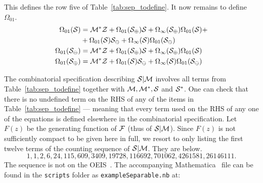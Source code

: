\documentclass[12pt, a4paper, twoside]{report}
\begin{document}
This defines the row five of Table~\ref{tab:sep_todefine}. It now remains to define $\Omega_{01}$. 
\begin{align}
  \begin{aligned}
    \Omega_{01}(\S) %
    &= \Mstar\Z + \Omega_{01}(\S_\oplus)\S + \Omega_\infty(\S_\oplus)\Omega_{01}(\S) +\\
    &+\Omega_{01}(\S)\S_\ominus + \Omega_\infty(\S)\Omega_{01}(\S_\ominus)\\
    \Omega_{01}(\S_\ominus) %
    &= \Mstar\Z + \Omega_{01}(\S_\oplus)\S + \Omega_\infty(\S_\oplus)\Omega_{01}(\S)\\
    \Omega_{01}(\S_\oplus) %
    &= \Mstar\Z + \Omega_{01}(\S)\S_\ominus + \Omega_\infty(\S)\Omega_{01}(\S_\ominus)
  \end{aligned}
\end{align}

The combinatorial specification describing $\mathcal{S}|\mathcal{M}$ involves all terms from Table~\ref{tab:sep_todefine} together with $\mathcal{M}, \mathcal{M}^*, \mathcal{S}$ and $\mathcal{S}^*$. One can check that there is no undefined term on the RHS of any of the items in Table~\ref{tab:sep_todefine} --- meaning that every term used on the RHS of any one of the equations is defined elsewhere in the combinatorial specification. Let $F(z)$ be the generating function of $\mathcal{F}$ (thus of $\mathcal{S}|\mathcal{M}$). Since $F(z)$ is not sufficiently compact to be given here in full, we resort to only listing the first twelve terms of the counting sequence of $\mathcal{S}|\mathcal{M}$. They are below.
$$1,1,2,6,24,115,609,3409, 19728, 116692, 701062, 4261581, 26146111.$$
The sequence is not on the OEIS~\cite{oeis}. The accompanying Mathematica~\cite{mathematica} file can be found in the \texttt{scripts} folder as \texttt{exampleSeparable.nb} at:
\end{document}
